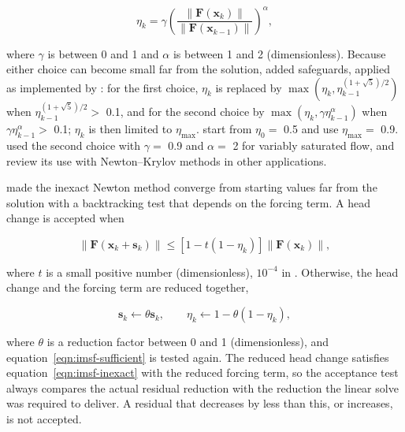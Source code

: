 \begin{equation}
	\label{eqn:imsf-choice2}
	\eta_k = \gamma \left( \frac{\| \mathbf{F}(\mathbf{x}_k) \|}{\| \mathbf{F}(\mathbf{x}_{k-1}) \|} \right)^{\alpha} ,
\end{equation}

\noindent where $\gamma$ is between 0 and 1 and $\alpha$ is between 1 and 2 (dimensionless). Because either choice can become small far from the solution, \cite{eisenstat1996forcing} added safeguards, applied as implemented by \cite{pernice1998nitsol}: for the first choice, $\eta_k$ is replaced by $\max(\eta_k, \eta_{k-1}^{(1+\sqrt{5})/2})$ when $\eta_{k-1}^{(1+\sqrt{5})/2} >$ 0.1, and for the second choice by $\max(\eta_k, \gamma \eta_{k-1}^{\alpha})$ when $\gamma \eta_{k-1}^{\alpha} >$ 0.1; $\eta_k$ is then limited to $\eta_{\max}$. \cite{pernice1998nitsol} start from $\eta_0 =$ 0.5 and use $\eta_{\max} =$ 0.9. \cite{jones2001newton} used the second choice with $\gamma =$ 0.9 and $\alpha =$ 2 for variably saturated flow, and \cite{knoll2004jacobian} review its use with Newton--Krylov methods in other applications.

\cite{eisenstat1994global} made the inexact Newton method converge from starting values far from the solution with a backtracking test that depends on the forcing term. A head change is accepted when

\begin{equation}
	\label{eqn:imsf-sufficient}
	\| \mathbf{F}(\mathbf{x}_k + \mathbf{s}_k) \| \le \left[ 1 - t (1 - \eta_k) \right] \| \mathbf{F}(\mathbf{x}_k) \| ,
\end{equation}

\noindent where $t$ is a small positive number (dimensionless), $10^{-4}$ in \cite{pernice1998nitsol}. Otherwise, the head change and the forcing term are reduced together,

\begin{equation}
	\label{eqn:imsf-reduce}
	\mathbf{s}_k \leftarrow \theta \mathbf{s}_k, \qquad \eta_k \leftarrow 1 - \theta (1 - \eta_k) ,
\end{equation}

\noindent where $\theta$ is a reduction factor between 0 and 1 (dimensionless), and equation~\ref{eqn:imsf-sufficient} is tested again. The reduced head change satisfies equation~\ref{eqn:imsf-inexact} with the reduced forcing term, so the acceptance test always compares the actual residual reduction with the reduction the linear solve was required to deliver. A residual that decreases by less than this, or increases, is not accepted.

